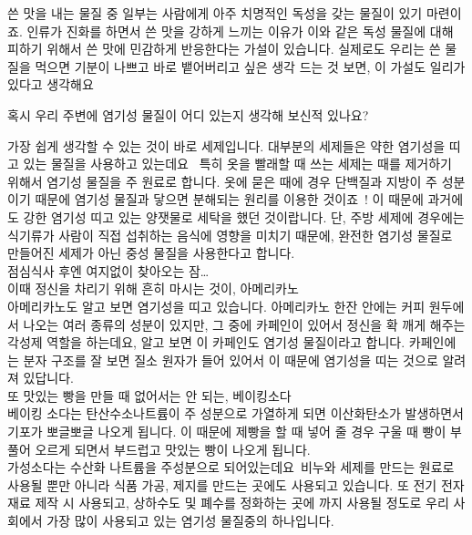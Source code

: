 \documentclass[12pt, a4paper, twoside]{book}
\begin{document}
				쓴 맛을 내는 물질 중 일부는 사람에게 아주 치명적인 독성을 갖는 물질이 있기 마련이죠. 
				인류가 진화를 하면서 쓴 맛을 강하게 느끼는 이유가 이와 같은 독성 물질에 대해 피하기 위해서 쓴 맛에 민감하게 반응한다는 가설이 있습니다. 
				실제로도 우리는 쓴 물질을 먹으면 기분이 나쁘고 바로 뱉어버리고 싶은 생각 드는 것 보면, 이 가설도 일리가 있다고 생각해요
				 
				 
				혹시 우리 주변에 염기성 물질이 어디 있는지 생각해 보신적 있나요?
				 
				가장 쉽게 생각할 수 있는 것이 바로 세제입니다. 
				대부분의 세제들은 약한 염기성을 띠고 있는 물질을 사용하고 있는데요~ 특히 옷을 빨래할 때 쓰는 세제는 때를 제거하기 위해서 염기성 물질을 주 원료로 합니다. 
				옷에 묻은 때에 경우 단백질과 지방이 주 성분이기 때문에 염기성 물질과 닿으면 분해되는 원리를 이용한 것이죠~! 
				이 때문에 과거에도 강한 염기성 띠고 있는 양잿물로 세탁을 했던 것이랍니다. 
				단, 주방 세제에 경우에는 식기류가 사람이 직접 섭취하는 음식에 영향을 미치기 때문에, 완전한 염기성 물질로 만들어진 세제가 아닌 중성 물질을 사용한다고 합니다. \\
				 
				 
				점심식사 후엔 여지없이 찾아오는 잠… \\
				이때 정신을 차리기 위해 흔히 마시는 것이, 아메리카노 \\
				아메리카노도 알고 보면 염기성을 띠고 있습니다. 
				아메리카노 한잔 안에는 커피 원두에서 나오는 여러 종류의 성분이 있지만, 그 중에 카페인이 있어서 정신을 확 깨게 해주는 각성제 역할을 하는데요, 알고 보면 이 카페인도 염기성 물질이라고 합니다. 
				카페인에는 분자 구조를 잘 보면 질소 원자가 들어 있어서 이 때문에 염기성을 띠는 것으로 알려져 있답니다. \\
				 
				또 맛있는 빵을 만들 때 없어서는 안 되는, 베이킹소다 \\
				베이킹 소다는 탄산수소나트륨이 주 성분으로 가열하게 되면 이산화탄소가 발생하면서 기포가 뽀글뽀글 나오게 됩니다. 
				이 때문에 제빵을 할 때 넣어 줄 경우 구울 때 빵이 부풀어 오르게 되면서 부드럽고 맛있는 빵이 나오게 됩니다. \\
				 
				가성소다는 수산화 나트륨을 주성분으로 되어있는데요~비누와 세제를 만드는 원료로 사용될 뿐만 아니라 식품 가공, 제지를 만드는 곳에도 사용되고 있습니다. 
				또 전기 전자 재료 제작 시 사용되고, 상하수도 및 폐수를 정화하는 곳에 까지 사용될 정도로 우리 사회에서 가장 많이 사용되고 있는 염기성 물질중의 하나입니다. \\
				 
\end{document}
